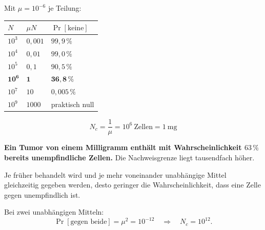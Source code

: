 \begin{warnung}
Mit $\mu = 10^{-6}$ je Teilung:

\begin{center}
{\small
\renewcommand{\arraystretch}{1.48}
\begin{tabular}{@{}P{1.8cm}P{2.4cm}P{2.8cm}@{}}
\toprule
$N$ & $\mu N$ & $\Pr[\text{keine}]$\\
\midrule
$10^{3}$ & $0{,}001$ & $99{,}9\,\%$\\
$10^{4}$ & $0{,}01$ & $99{,}0\,\%$\\
$10^{5}$ & $0{,}1$ & $90{,}5\,\%$\\
$\mathbf{10^{6}}$ & $\mathbf{1}$ & $\mathbf{36{,}8\,\%}$\\
$10^{7}$ & $10$ & $0{,}005\,\%$\\
$10^{9}$ & $1000$ & \textcolor{akzent}{praktisch null}\\
\bottomrule
\end{tabular}}
\end{center}

\[ N_c = \frac{1}{\mu} = 10^{6} \ \text{Zellen} = 1\ \mathrm{mg} \]

\begin{center}
\begin{minipage}{0.9\textwidth}
\textbf{Ein Tumor von einem Milligramm enthält mit Wahrscheinlichkeit $63\,\%$ bereits unempfindliche Zellen.} Die Nachweisgrenze liegt tausendfach höher.
\end{minipage}
\end{center}

\begin{center}
\begin{minipage}{0.88\textwidth}
\end{minipage}
\end{center}

Je früher behandelt wird und je mehr voneinander unabhängige Mittel gleichzeitig gegeben werden, desto geringer die Wahrscheinlichkeit, dass eine Zelle gegen  unempfindlich ist.

Bei zwei unabhängigen Mitteln:
\[ \Pr[\text{gegen beide}] = \mu^2 = 10^{-12} \quad\Longrightarrow\quad N_c = 10^{12} . \]

\begin{center}
\begin{minipage}{0.88\textwidth}
\end{minipage}
\end{center}
\end{warnung}

